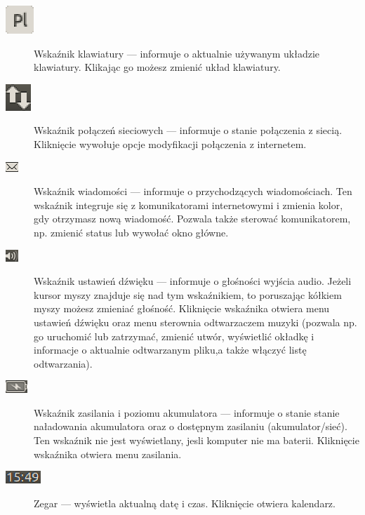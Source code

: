 \begin{description}
\item[\includegraphics{images/unity_wskaznik_klawiatura.png}]\textcolor{ubuntu_orange}{Wskaźnik klawiatury} --- informuje o aktualnie używanym układzie klawiatury. Klikając go możesz zmienić układ klawiatury.
\item[\includegraphics{images/unity_wskaznik_siec.png}]\textcolor{ubuntu_orange}{Wskaźnik połączeń sieciowych} --- informuje o stanie połączenia z siecią. Kliknięcie wywołuje opcje modyfikacji połączenia z internetem.
\item[\includegraphics{images/unity_wskaznik_wiadomosci.png}]\textcolor{ubuntu_orange}{Wskaźnik wiadomości} --- informuje o przychodzących wiadomościach. Ten wskaźnik integruje się z komunikatorami internetowymi i zmienia kolor, gdy otrzymasz nową wiadomość. Pozwala także sterować komunikatorem, np. zmienić status lub wywołać okno główne.
\item[\includegraphics{images/unity_wskaznik_dzwiek.png}]\textcolor{ubuntu_orange}{Wskaźnik ustawień dźwięku} --- informuje o głośności wyjścia audio. Jeżeli kursor myszy znajduje się nad tym wskaźnikiem, to poruszając kółkiem myszy możesz zmieniać głośność. Kliknięcie wskaźnika otwiera menu ustawień dźwięku oraz menu sterownia odtwarzaczem muzyki (pozwala np. go uruchomić lub zatrzymać, zmienić utwór, wyświetlić okładkę i informacje o aktualnie odtwarzanym pliku,a także włączyć listę odtwarzania).
\item[\includegraphics{images/unity_wskaznik_zasilanie.png}]\textcolor{ubuntu_orange}{Wskaźnik zasilania i poziomu akumulatora} --- informuje o stanie stanie naładowania akumulatora oraz o dostępnym zasilaniu (akumulator/sieć). Ten wskaźnik nie jest wyświetlany, jesli komputer nie ma baterii. Kliknięcie wskaźnika otwiera menu zasilania.
\item[\includegraphics{images/unity_wskaznik_zegar.png}]\textcolor{ubuntu_orange}{Zegar} --- wyświetla aktualną datę i czas. Kliknięcie otwiera kalendarz.

\end{description}
